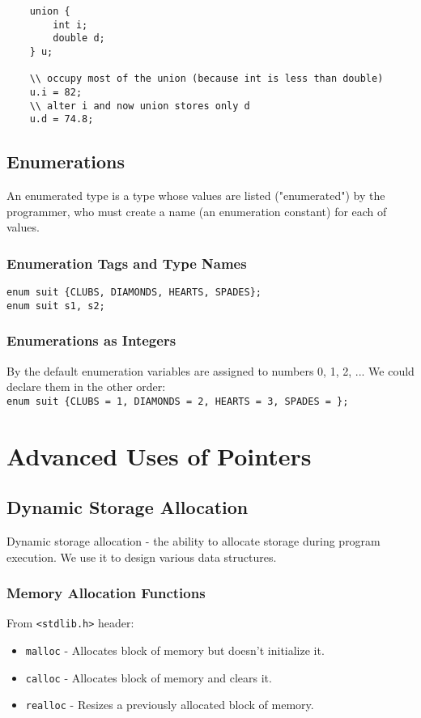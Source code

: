 \documentclass[openany]{book}
\begin{document}
    \begin{lstlisting}
    union {
        int i;
        double d;
    } u;

    \\ occupy most of the union (because int is less than double)
    u.i = 82;
    \\ alter i and now union stores only d
    u.d = 74.8;
    \end{lstlisting}

    \section{Enumerations} 
    An enumerated type is a type whose values are listed ("enumerated") by the programmer, who must create a name (an enumeration constant) for each of values.
    
    \subsection*{Enumeration Tags and Type Names}

    \texttt{enum suit \{CLUBS, DIAMONDS, HEARTS, SPADES\};} \\
    \texttt{enum suit s1, s2;}

    \subsection*{Enumerations as Integers}
    By the default enumeration variables are assigned to numbers 0, 1, 2, ... We could declare them in the other order: \\
    \texttt{enum suit \{CLUBS = 1, DIAMONDS = 2, HEARTS = 3, SPADES = \};} \\



    \chapter{Advanced Uses of Pointers}

    \section{Dynamic Storage Allocation}
    Dynamic storage allocation - the ability to allocate storage during program execution. We use it to design various data structures.

    \subsection*{Memory Allocation Functions}
    From \texttt{<stdlib.h>} header:
    \begin{itemize}
        \item \texttt{malloc} - Allocates block of memory but doesn't initialize it.
        \item \texttt{calloc} - Allocates block of memory and clears it.
        \item \texttt{realloc} - Resizes a previously allocated block of memory.
    \end{itemize}
\end{document}

